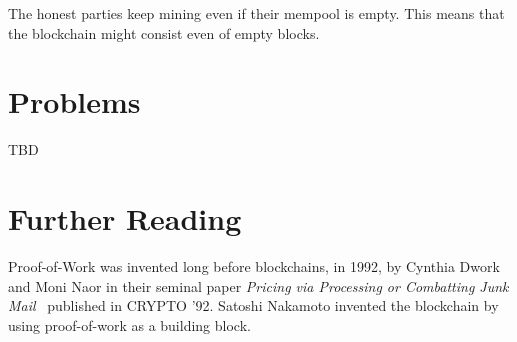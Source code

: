 The honest parties keep mining even if their mempool is empty. This means that the blockchain
might consist even of empty blocks.

\section*{Problems}
TBD

\section*{Further Reading}

Proof-of-Work was invented long before blockchains, in 1992, by Cynthia Dwork and Moni Naor
in their seminal paper \emph{Pricing via Processing or Combatting Junk Mail}~\cite{pow} published
in CRYPTO '92. Satoshi Nakamoto invented the blockchain by using proof-of-work as a building block.
